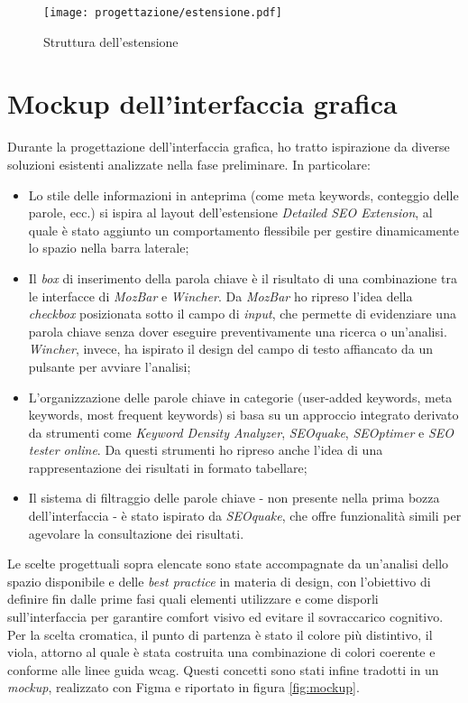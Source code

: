 \begin{figure}[H]
  \centering 
  \texttt{[image: progettazione/estensione.pdf]}
  \caption{Struttura dell'estensione}
  \label{fig:struttura_estensione}
\end{figure}

\section{Mockup dell'interfaccia grafica}
\label{sec:mockup}

\par Durante la progettazione dell’interfaccia grafica, ho tratto ispirazione da diverse soluzioni esistenti analizzate nella fase preliminare. In particolare:
\begin{itemize}
    \item Lo stile delle informazioni in anteprima (come meta keywords, conteggio delle parole, ecc.) si ispira al layout dell’estensione \textit{Detailed SEO Extension}, al quale è stato aggiunto un comportamento flessibile per gestire dinamicamente lo spazio nella barra laterale;
    \item Il \textit{box} di inserimento della parola chiave è il risultato di una combinazione tra le interfacce di \textit{MozBar} e \textit{Wincher}. Da \textit{MozBar} ho ripreso l’idea della \textit{checkbox} posizionata sotto il campo di \textit{input}, che permette di evidenziare una parola chiave senza dover eseguire preventivamente una ricerca o un’analisi. \textit{Wincher}, invece, ha ispirato il design del campo di testo affiancato da un pulsante per avviare l’analisi;
    \item L’organizzazione delle parole chiave in categorie (user-added keywords, meta keywords, most frequent keywords) si basa su un approccio integrato derivato da strumenti come \textit{Keyword Density Analyzer}, \textit{SEOquake}, \textit{SEOptimer} e \textit{SEO tester online}. Da questi strumenti ho ripreso anche l’idea di una rappresentazione dei risultati in formato tabellare;
    \item Il sistema di filtraggio delle parole chiave - non presente nella prima bozza dell’interfaccia - è stato ispirato da \textit{SEOquake}, che offre funzionalità simili per agevolare la consultazione dei risultati.
\end{itemize}

\vspace{5pt}
\par\noindent Le scelte progettuali sopra elencate sono state accompagnate da un’analisi dello spazio disponibile e delle \textit{best practice} in materia di design, con l’obiettivo di definire fin dalle prime fasi quali elementi utilizzare e come disporli sull’interfaccia per garantire comfort visivo ed evitare il sovraccarico cognitivo. Per la scelta cromatica, il punto di partenza è stato il colore più distintivo, il viola, attorno al quale è stata costruita una combinazione di colori coerente e conforme alle linee guida \gls{wcag}. Questi concetti sono stati infine tradotti in un \textit{mockup}, realizzato con Figma e riportato in figura \ref{fig:mockup}.

